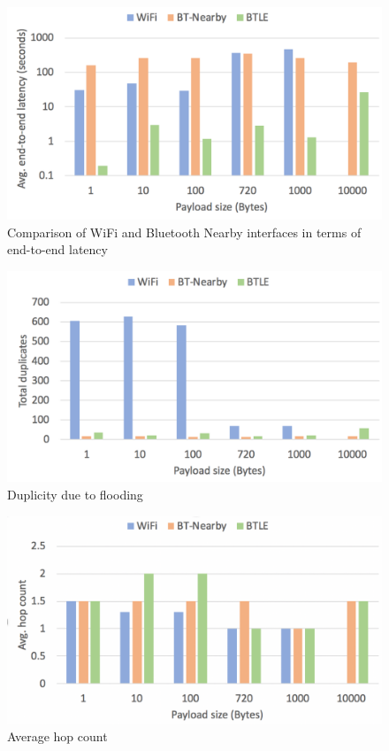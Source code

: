 \documentclass[conference]{IEEEtran}
\begin{document}
\begin{figure}[htbp]
\centerline{\includegraphics[width=\columnwidth]{figs/e2e_latency}}
\caption{Comparison of WiFi and Bluetooth Nearby interfaces in terms
  of end-to-end latency}
\label{fig:e2e}
\end{figure}

\begin{figure}[htbp]
\centerline{\includegraphics[width=\columnwidth]{figs/duplicates}}
\caption{Duplicity due to flooding}
\label{fig:dup}
\end{figure}

\begin{figure}[htbp]
\centerline{\includegraphics[width=\columnwidth]{figs/hops}}
\caption{Average hop count}
\label{fig:hop}
\end{figure}
\end{document}
